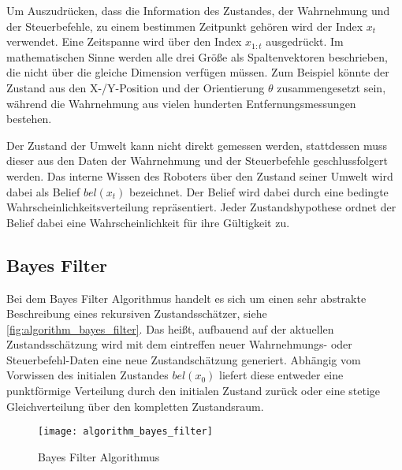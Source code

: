 Um Auszudrücken, dass die Information des Zustandes, der Wahrnehmung und der Steuerbefehle, zu einem bestimmen Zeitpunkt gehören wird der Index $x_t$ verwendet.
Eine Zeitspanne wird über den Index $x_{1:t}$ ausgedrückt.
Im mathematischen Sinne werden alle drei Größe als Spaltenvektoren beschrieben, die nicht über die gleiche Dimension verfügen müssen.
Zum Beispiel könnte der Zustand aus den X-/Y-Position und der Orientierung $\theta$ zusammengesetzt sein, während die Wahrnehmung aus vielen hunderten Entfernungsmessungen bestehen.

Der Zustand der Umwelt kann nicht direkt gemessen werden, stattdessen muss dieser aus den Daten der Wahrnehmung und der Steuerbefehle geschlussfolgert werden.
Das interne Wissen des Roboters über den Zustand seiner Umwelt wird dabei als Belief $bel(x_t)$ bezeichnet.
Der Belief wird dabei durch eine bedingte Wahrscheinlichkeitsverteilung repräsentiert.
Jeder Zustandshypothese ordnet der Belief dabei eine Wahrscheinlichkeit für ihre Gültigkeit zu.


%
%
\subsection{Bayes Filter}

Bei dem Bayes Filter Algorithmus handelt es sich um einen sehr abstrakte Beschreibung eines rekursiven Zustandsschätzer, siehe \autoref{fig:algorithm_bayes_filter}. Das heißt, aufbauend  auf der aktuellen Zustandsschätzung wird mit dem eintreffen neuer Wahrnehmungs- oder Steuerbefehl-Daten eine neue Zustandschätzung generiert. Abhängig vom Vorwissen des initialen Zustandes $bel(x_0)$ liefert diese entweder eine punktförmige Verteilung durch den initialen Zustand zurück oder eine stetige Gleichverteilung über den kompletten Zustandsraum. 

\begin{figure}
	\centering
	\texttt{[image: algorithm\_bayes\_filter]}
	\caption{Bayes Filter Algorithmus \cite{thrun2005probabilistic}}
	\label{fig:algorithm_bayes_filter}
\end{figure}

